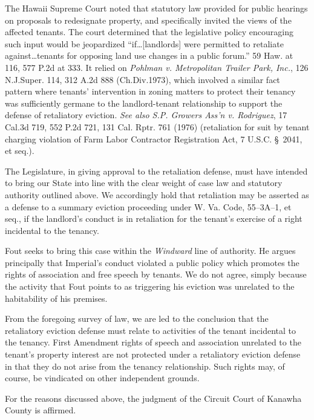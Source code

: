 The Hawaii Supreme Court noted that statutory law provided for public hearings
on proposals to redesignate property, and specifically invited the views of the
affected tenants. The court determined that the legislative policy encouraging
such input would be jeopardized ``if\ldots [landlords] were permitted to
retaliate against\ldots tenants for opposing land use changes in a public
forum.'' 59 Haw. at 116, 577 P.2d at 333. It relied on \textit{Pohlman v.
Metropolitan Trailer Park, Inc.}, 126 N.J.Super. 114, 312 A.2d 888
(Ch.Div.1973), which involved a similar fact pattern where tenants'
intervention in zoning matters to protect their tenancy was sufficiently
germane to the landlord-tenant relationship to support the defense of
retaliatory eviction. \textit{See also S.P. Growers Ass'n v. Rodriguez}, 17
Cal.3d 719, 552 P.2d 721, 131 Cal. Rptr. 761 (1976) (retaliation for suit by
tenant charging violation of Farm Labor Contractor Registration Act, 7 U.S.C.
\S~2041, et seq.).

The Legislature, in giving approval to the retaliation defense, must have
intended to bring our State into line with the clear weight of case law and
statutory authority outlined above. We accordingly hold that retaliation may be
asserted as a defense to a summary eviction proceeding under W. Va. Code,
55--3A--1, et seq., if the landlord's conduct is in retaliation for the
tenant's exercise of a right incidental to the tenancy.

Fout seeks to bring this case within the \textit{Windward} line of authority. He
argues principally that Imperial's conduct violated a public policy which
promotes the rights of association and free speech by tenants. We do not agree,
simply because the activity that Fout points to as triggering his eviction was
unrelated to the habitability of his premises.

From the foregoing survey of law, we are led to the conclusion that the
retaliatory eviction defense must relate to activities of the tenant incidental
to the tenancy. First Amendment rights of speech and association unrelated to
the tenant's property interest are not protected under a retaliatory eviction
defense in that they do not arise from the tenancy relationship. Such rights
may, of course, be vindicated on other independent grounds.

For the reasons discussed above, the judgment of the Circuit Court of Kanawha
County is affirmed.

